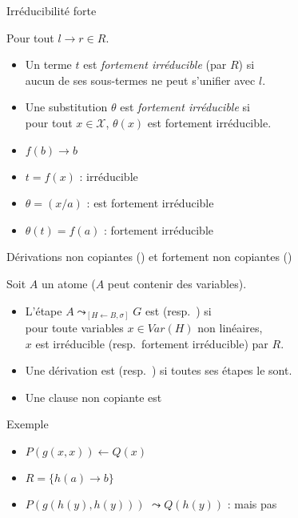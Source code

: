 \begin{frame}{Irréducibilité forte}
  \begin{Definition}
    Pour tout $l \rightarrow r \in R$.\\
    \begin{itemize}[<+->]
    \item Un terme $t$ est {\em fortement irréducible} (par $R$) si\\
      aucun de ses sous-termes ne peut s'unifier avec $l$.\\
    \item Une substitution $\theta$ est {\em fortement irréducible} si\\
      pour tout $x \in \mathcal{X}$, $\theta(x)$ est fortement irréducible.
    \end{itemize}
  \end{Definition}
  \begin{itemize}
  \item {} $f(b) \rightarrow b$
  \item {} $t = f(x)$ :  irréducible
  \item {} $\theta = (x/a)$ :  est fortement irréducible
  \item {} $\theta(t) = f(a)$ :  fortement irréducible
  \end{itemize}
\end{frame}

\begin{frame}{{\large Dérivations non copiantes (\nc) et fortement non copiantes (\snc)}}
  \begin{Definition}
    Soit $A$ un atome ($A$ peut contenir des variables).\\
    \begin{itemize}[<+->]
    \item L'étape $A \leadsto_{[H\leftarrow B,\sigma]} G$ est \nc (resp.\ \snc) si \\
      pour toute variables $x \in Var(H)$ non linéaires,\\
      $x$ est irréducible (resp.\ fortement irréducible) par $R$.\\
    \item Une dérivation est \nc (resp.\ \snc) si toutes ses étapes le sont.
    \end{itemize}
  \end{Definition}
  \begin{itemize}[<+->]
  \item Une clause non copiante est \snc
  \end{itemize}
  \begin{exampleblock}{Exemple}
    \begin{itemize}[<+->]
    \item $P(g(x,x)) \leftarrow Q(x)$
    \item $R = \{h(a) \rightarrow b\}$
    \item $P(g(h(y),h(y)))$ $\leadsto Q(h(y))$ : \nc mais pas \snc
    \end{itemize}
  \end{exampleblock}
\end{frame}


